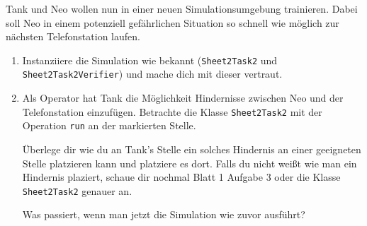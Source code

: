 

Tank und Neo wollen nun in einer neuen Simulationsumgebung trainieren. 
Dabei soll Neo in einem potenziell gefährlichen Situation so schnell wie möglich zur nächsten Telefonstation laufen.

\begin{enumerate}
    \item Instanziiere die Simulation wie bekannt (\lstinline{Sheet2Task2} und \lstinline{Sheet2Task2Verifier}) und mache dich mit dieser vertraut.
    \item Als Operator hat Tank die Möglichkeit Hindernisse zwischen Neo und der Telefonstation einzufügen.
        Betrachte die Klasse \lstinline{Sheet2Task2} mit der Operation \lstinline{run} an der markierten Stelle.

        Überlege dir wie du an Tank's Stelle ein solches Hindernis an einer geeigneten Stelle platzieren kann und platziere es dort. Falls du nicht weißt wie man ein Hindernis plaziert, schaue dir nochmal Blatt 1 Aufgabe 3 oder die Klasse \lstinline{Sheet2Task2} genauer an.

        Was passiert, wenn man jetzt die Simulation wie zuvor ausführt?\\
        
\end{enumerate}

